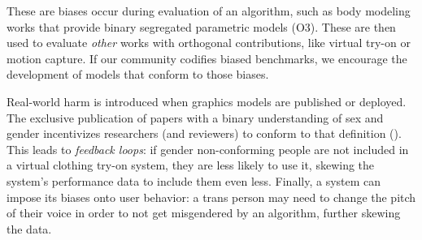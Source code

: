 \documentclass[sigconf,balance=false]{acmart}
\begin{document}

 These are biases occur during evaluation of an algorithm, such as body modeling works that provide binary segregated parametric models (O3). These are then used to evaluate \emph{other} works with orthogonal contributions, like virtual try-on or motion capture. If our community codifies biased benchmarks, we encourage the development of models that conform to those biases.




 Real-world harm is introduced when graphics models are published or deployed. The exclusive publication of papers with a binary understanding of sex and gender incentivizes researchers (and reviewers) to conform to that definition (\binary).
This leads to \emph{feedback loops}: if gender non-conforming people are not included in a virtual clothing try-on system, they are less likely to use it, skewing the system's performance data to include them even less. Finally, a system can impose its biases onto user behavior: a trans person may need to change the pitch of their voice in order to not get misgendered by an algorithm, further skewing the data.

\vspace{-0.1cm}
\end{document}
